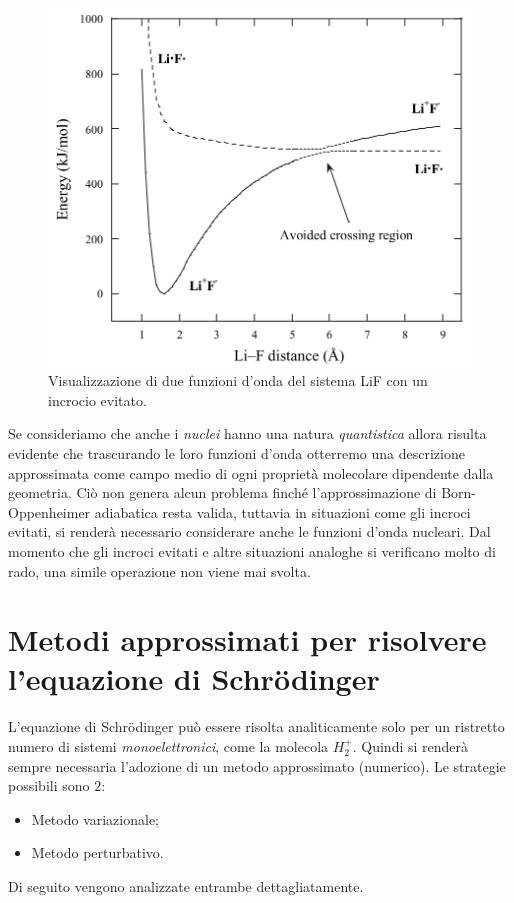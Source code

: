 \documentclass[oneside]{amsbook}
\numberwithin{section}{chapter}
\numberwithin{equation}{section}
\numberwithin{figure}{section}
\begin{document}
\begin{figure}[H]
\centering
\caption{ Visualizzazione di due funzioni d'onda del sistema LiF con un incrocio evitato.}\label{TonyNelly}
\includegraphics[scale=0.3]{ton}
\end{figure}
Se consideriamo che anche i \emph{nuclei} hanno una natura \emph{quantistica} allora risulta evidente che trascurando le loro funzioni d'onda otterremo una descrizione approssimata come campo medio di ogni proprietà molecolare dipendente dalla geometria. Ciò non genera alcun problema finché l'approssimazione di Born-Oppenheimer adiabatica resta valida, tuttavia in situazioni come gli incroci evitati, si renderà necessario considerare anche le funzioni d'onda nucleari. Dal momento che gli incroci evitati e altre situazioni analoghe si verificano molto di rado, una simile operazione non viene mai svolta.
\section{Metodi approssimati per risolvere l'equazione di Schr\"odinger}
L'equazione di Schr\"odinger può essere risolta analiticamente solo per un ristretto numero di sistemi \emph{monoelettronici}, come la molecola $H_{2}^+$. Quindi si renderà sempre necessaria l'adozione di un metodo approssimato (numerico). Le strategie possibili sono $2$:
\begin{itemize}
\item Metodo variazionale;
\item Metodo perturbativo.
\end{itemize}
Di seguito vengono analizzate entrambe dettagliatamente.
\end{document}
